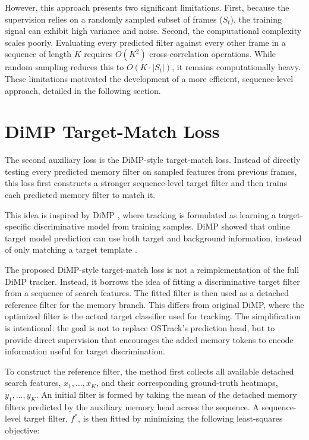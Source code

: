\documentclass[bachelorthesis]{fer}
\numberwithin{equation}{chapter}
\begin{document}
    However, this approach presents two significant limitations. First, because the supervision relies on a randomly sampled subset of frames (\({S}_t\)), the training signal can exhibit high variance and noise. Second, the computational complexity scales poorly. Evaluating every predicted filter against every other frame in a sequence of length \(K\) requires \(O(K^2)\) cross-correlation operations. While random sampling reduces this to \(O(K \cdot |{S}_t|)\), it remains computationally heavy. These limitations motivated the development of a more efficient, sequence-level approach, detailed in the following section.


    \section{DiMP Target-Match Loss}\label{dimp-target-match-loss}

    The second auxiliary loss is the DiMP-style target-match loss. Instead of directly testing every predicted memory
    filter on sampled features from previous frames, this loss first constructs a stronger sequence-level target filter and
    then trains each predicted memory filter to match it.

    This idea is inspired by DiMP \cite{bhat2019dimp}, where tracking is formulated as learning a target-specific discriminative model from
    training samples. DiMP showed that online target model prediction can use both target and background information,
    instead of only matching a target template \cite{bhat2019dimp}.

    The proposed DiMP-style target-match loss is not a reimplementation of the full DiMP tracker. Instead, it borrows the
    idea of fitting a discriminative target filter from a sequence of search features. The fitted filter is then used as a
    detached reference filter for the memory branch. This differs from original DiMP, where the optimized filter is the actual
    target classifier used for tracking. The simplification is intentional: the goal is not to replace OSTrack's prediction
    head, but to provide direct supervision that encourages the added memory tokens to encode information useful for target
    discrimination.


    To construct the reference filter, the method first collects all available detached search features,
    \(x_1, \dots, x_K\), and their corresponding ground-truth heatmaps, \(y_1, \dots, y_K\). An initial
    filter is formed by taking the mean of the detached memory filters predicted by the auxiliary
    memory head across the sequence. A sequence-level target filter, \(f^*\), is then fitted by
    minimizing the following least-squares objective:
\end{document}
